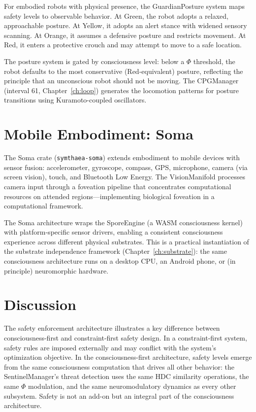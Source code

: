 \documentclass[12pt]{book}
\begin{document}
For embodied robots with physical presence, the GuardianPosture system maps safety levels to observable behavior. At Green, the robot adopts a relaxed, approachable posture. At Yellow, it adopts an alert stance with widened sensory scanning. At Orange, it assumes a defensive posture and restricts movement. At Red, it enters a protective crouch and may attempt to move to a safe location.

The posture system is gated by consciousness level: below a $\Phi$ threshold, the robot defaults to the most conservative (Red-equivalent) posture, reflecting the principle that an unconscious robot should not be moving. The CPGManager (interval 61, Chapter~\ref{ch:loop}) generates the locomotion patterns for posture transitions using Kuramoto-coupled oscillators.

\section{Mobile Embodiment: Soma}

The Soma crate (\texttt{symthaea-soma}) extends embodiment to mobile devices with sensor fusion: accelerometer, gyroscope, compass, GPS, microphone, camera (via screen vision), touch, and Bluetooth Low Energy. The VisionManifold processes camera input through a foveation pipeline that concentrates computational resources on attended regions---implementing biological foveation in a computational framework.

The Soma architecture wraps the SporeEngine (a WASM consciousness kernel) with platform-specific sensor drivers, enabling a consistent consciousness experience across different physical substrates. This is a practical instantiation of the substrate independence framework (Chapter~\ref{ch:substrate}): the same consciousness architecture runs on a desktop CPU, an Android phone, or (in principle) neuromorphic hardware.

\section{Discussion}

The safety enforcement architecture illustrates a key difference between consciousness-first and constraint-first safety design. In a constraint-first system, safety rules are imposed externally and may conflict with the system's optimization objective. In the consciousness-first architecture, safety levels emerge from the same consciousness computation that drives all other behavior: the SentinelManager's threat detection uses the same HDC similarity operations, the same $\Phi$ modulation, and the same neuromodulatory dynamics as every other subsystem. Safety is not an add-on but an integral part of the consciousness architecture.
\end{document}
